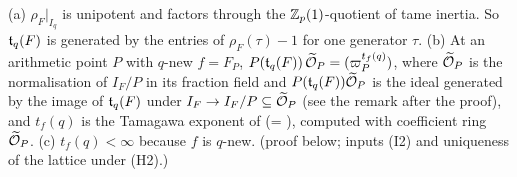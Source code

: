 \begin{lemma}\label{lem:s06-tam}
(a) $\rho_F|_{I_q}$ is unipotent and factors through the $\mathbb{Z}_p(1)$-quotient of tame inertia. So $\mathfrak{t}_q(F)$ is generated by the
entries of $\rho_F(\tau)-1$ for one generator $\tau$. (b) At an arithmetic point $P$ with $q$-new $f=F_P$,
$P(\mathfrak{t}_q(F))\,\widetilde{\mathcal{O}}_P=(\varpi_P^{t_f(q)})$, where $\widetilde{\mathcal{O}}_P$ is the normalisation of $I_F/P$ in its fraction field and $P(\mathfrak{t}_q(F))\widetilde{\mathcal{O}}_P$ is the ideal generated by the image of $\mathfrak{t}_q(F)$ under $I_F\to I_F/P\subseteq\widetilde{\mathcal{O}}_P$ (see the remark after the proof), and $t_f(q)$ is the Tamagawa exponent of
\cite[Def.~2.12]{KO}  (= \cite[Def.~3.3]{PW} ),
computed with coefficient ring $\widetilde{\mathcal{O}}_P$. (c) $t_f(q)<\infty$ because $f$ is $q$-new. \stpmc{} (proof below; inputs (I2) and
uniqueness of the lattice under (H2).)
\end{lemma}
